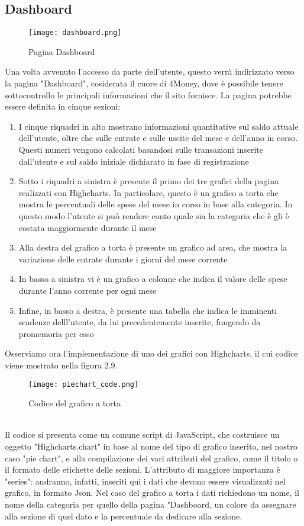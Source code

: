 \documentclass[binding=0.6cm, oneside, noexaminfo, italian]{sapthesis}
\begin{document}
\subsection{Dashboard}
\begin{figure}[h]
    \centering
    \texttt{[image: dashboard.png]}
    \caption{Pagina Dashboard}
    \label{fig:dashboard}
\end{figure}
Una volta avvenuto l'accesso da parte dell'utente, questo verrà indirizzato verso la pagina "Dashboard", cosiderata il cuore di 4Money, dove è possibile tenere sottocontrollo le principali informazioni che il sito fornisce. La pagina potrebbe essere definita in cinque sezioni:
\begin{enumerate}
    \item I cinque riquadri in alto mostrano informazioni quantitative sul saldo attuale dell'utente, oltre che sulle entrate e sulle uscite del mese e dell'anno in corso. Questi numeri vengono calcolati basandosi sulle transazioni inserite dall'utente e sul saldo iniziale dichiarato in fase di registrazione
    \item Sotto i riquadri a sinistra è presente il primo dei tre grafici della pagina realizzati con Highcharts. In particolare, questo è un grafico a torta che mostra le percentuali delle spese del mese in corso in base alla categoria. In questo modo l'utente si può rendere conto quale sia la categoria che è gli è costata maggiormente durante il mese
    \item Alla destra del grafico a torta è presente un grafico ad area, che mostra la variazione delle entrate durante i giorni del mese corrente
    \item In basso a sinistra vi è un grafico a colonne che indica il valore delle spese durante l'anno corrente per ogni mese
    \item Infine, in basso a destra, è presente una tabella che indica le imminenti scadenze delll'utente, da lui precedentemente inserite, fungendo da promemoria per esso
\end{enumerate}
Osserviamo ora l'implementazione di uno dei grafici con Highcharts, il cui codice viene mostrato nella figura 2.9. \\
\begin{figure}[h]
    \centering
    \texttt{[image: piechart\_code.png]}
    \caption{Codice del grafico a torta}
    \label{fig:piechart_code}
\end{figure} \\
Il codice si presenta come un comune script di JavaScript, che costruisce un oggetto "Highcharts.chart" in base al nome del tipo di grafico inserito, nel nostro caso "pie chart", e alla compilazione dei vari attributi del grafico, come il titolo o il formato delle etichette delle sezioni. L'attributo di maggiore importanza è "series": andranno, infatti, inseriti qui i dati che devono essere visualizzati nel grafico, in formato Json. Nel caso del grafico a torta i dati richiedono un nome, il nome della categoria per quello della pagina "Dashboard, un colore da assegnare alla sezione di quel dato e la percentuale da dedicare alla sezione. \\
\end{document}
